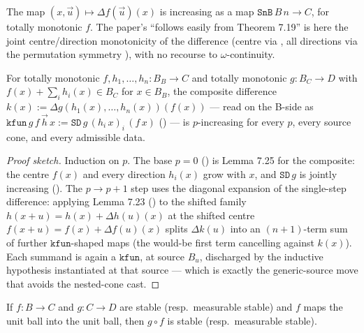 \begin{lemma}[Lemma 7.25]\label{lem:725}
\rocqok{}
The map $(x, \vec u) \mapsto \Delta f(\vec u)(x)$ is increasing as a map
$\texttt{SnB}\,B\,n \to C$, for totally monotonic $f$. The paper's
``follows easily from Theorem 7.19'' is here the joint
centre/direction monotonicity 
of the difference (centre via
, all directions via the
permutation symmetry ), with no
recourse to $\omega$-continuity.
\end{lemma}

\begin{lemma}[Lemma 7.26]\label{lem:726}
\rocqok
{}
For totally monotonic $f, h_1, \dots, h_n : B_B \to C$ and totally
monotonic $g : B_C \to D$ with $f(x) + \sum_i h_i(x) \in B_C$ for
$x \in B_B$, the composite difference
$k(x) := \Delta g(h_1(x), \dots, h_n(x))(f(x))$ --- read on the B-side
as $\texttt{kfun}\,g\,f\,\vec h\,x := \texttt{SD}\,g\,(h_i\,x)_i\,(f\,x)$
() --- is $p$-increasing for every $p$,
every source cone, and every admissible data.
\end{lemma}

\begin{proof}[Proof sketch]
Induction on $p$. The base $p = 0$
() is Lemma 7.25 for the
composite: the centre $f(x)$ and every direction $h_i(x)$ grow with $x$,
and $\texttt{SD}\,g$ is jointly increasing
(). The $p \to p+1$ step uses
the diagonal expansion  of the
single-step difference: applying Lemma 7.23
() to the shifted family
$h(x+u) = h(x) + \Delta h(u)(x)$ at the shifted centre
$f(x+u) = f(x) + \Delta f(u)(x)$ splits $\Delta k(u)$ into an
$(n+1)$-term sum of further $\texttt{kfun}$-shaped maps (the would-be
first term cancelling against $k(x)$). Each summand is again a
$\texttt{kfun}$, at source $B_u$, discharged by the inductive
hypothesis instantiated at that source --- which is exactly the
generic-source move that avoids the nested-cone cast.
\end{proof}

\begin{theorem}\label{thm:730}
\rocqok
{}\rocqok
{}
If $f : B \to C$ and $g : C \to D$ are stable (resp.\ measurable stable)
and $f$ maps the unit ball into the unit ball, then $g \circ f$ is
stable (resp.\ measurable stable).
\end{theorem}


